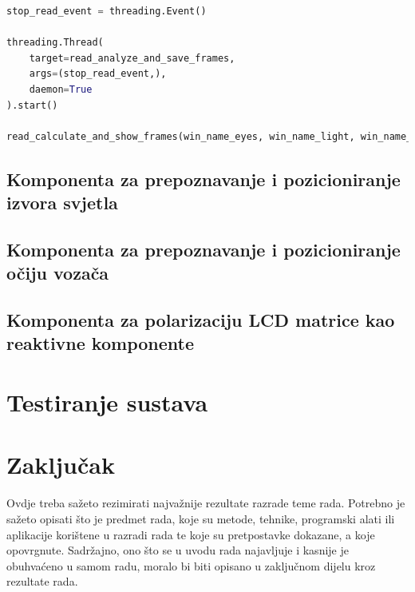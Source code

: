 \documentclass{foi}
\begin{document}
\begin{lstlisting}[language=Python, label={lst:lstlisting_4}, firstnumber=160, style=colored, caption={Inicijaliziranje dretvenog događaja, stvaranje i pokretanje nove dretve i pozivanje funkcije u glavnoj dretvi}]
stop_read_event = threading.Event()

threading.Thread(
    target=read_analyze_and_save_frames,
    args=(stop_read_event,),
    daemon=True
).start()

read_calculate_and_show_frames(win_name_eyes, win_name_light, win_name_protection)
\end{lstlisting}

\section{Komponenta za prepoznavanje i pozicioniranje izvora svjetla}

\section{Komponenta za prepoznavanje i pozicioniranje očiju vozača}

\section{Komponenta za polarizaciju LCD matrice kao reaktivne komponente}

\chapter{Testiranje sustava}

\chapter{Zaključak}

Ovdje treba sažeto rezimirati najvažnije rezultate razrade teme rada. Potrebno je sažeto opisati što je predmet rada, koje su metode, tehnike, programski alati ili aplikacije korištene u razradi rada te koje su pretpostavke dokazane, a koje opovrgnute. Sadržajno, ono što se u uvodu rada najavljuje i kasnije je obuhvaćeno u samom radu, moralo bi biti opisano u zaključnom dijelu kroz rezultate rada.

\printbibliography[title=Popis literature]

\listoffigures
{}
 
\listoftables
{}
\end{document}
